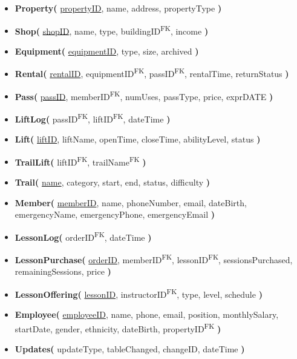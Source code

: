 \documentclass[11pt]{scrartcl}
\begin{document}
\begin{itemize}
  \item \textbf{Property(} \underline{propertyID}, name, address, propertyType \textbf{)}

  \item \textbf{Shop(} \underline{shopID}, name, type, buildingID\textsuperscript{FK}, income \textbf{)}

  \item \textbf{Equipment(} \underline{equipmentID}, type, size, archived \textbf{)}

  \item \textbf{Rental(} \underline{rentalID}, equipmentID\textsuperscript{FK}, passID\textsuperscript{FK}, rentalTime, returnStatus \textbf{)}

  \item \textbf{Pass(} \underline{passID}, memberID\textsuperscript{FK}, numUses, passType, price, exprDATE \textbf{)}

  \item \textbf{LiftLog(} passID\textsuperscript{FK}, liftID\textsuperscript{FK}, dateTime \textbf{)}

  \item \textbf{Lift(} \underline{liftID}, liftName, openTime, closeTime, abilityLevel, status \textbf{)}

  \item \textbf{TrailLift(} liftID\textsuperscript{FK}, trailName\textsuperscript{FK} \textbf{)}

  \item \textbf{Trail(} \underline{name}, category, start, end, status, difficulty \textbf{)}

  \item \textbf{Member(} \underline{memberID}, name, phoneNumber, email, dateBirth, emergencyName, emergencyPhone, emergencyEmail \textbf{)}

  \item \textbf{LessonLog(} orderID\textsuperscript{FK}, dateTime \textbf{)}

  \item \textbf{LessonPurchase(} \underline{orderID}, memberID\textsuperscript{FK}, lessonID\textsuperscript{FK}, sessionsPurchased, remainingSessions, price \textbf{)}

  \item \textbf{LessonOffering(} \underline{lessonID}, instructorID\textsuperscript{FK}, type, level, schedule \textbf{)}

  \item \textbf{Employee(} \underline{employeeID}, name, phone, email, position, monthlySalary, startDate, gender, ethnicity, dateBirth, propertyID\textsuperscript{FK} \textbf{)}

  \item \textbf{Updates(} updateType, tableChanged, changeID, dateTime \textbf{)}
\end{itemize}
\end{document}

